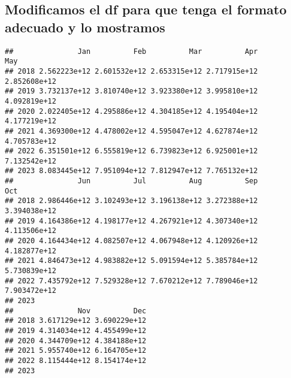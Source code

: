 \documentclass[
]{book}
\newenvironment{Shaded}{\begin{snugshade}}{\end{snugshade}}
\newcommand{\AttributeTok}[1]{\textcolor[rgb]{0.77,0.63,0.00}{#1}}
\newcommand{\CommentTok}[1]{\textcolor[rgb]{0.56,0.35,0.01}{\textit{#1}}}
\newcommand{\DecValTok}[1]{\textcolor[rgb]{0.00,0.00,0.81}{#1}}
\newcommand{\FunctionTok}[1]{\textcolor[rgb]{0.00,0.00,0.00}{#1}}
\newcommand{\NormalTok}[1]{#1}
\newcommand{\OtherTok}[1]{\textcolor[rgb]{0.56,0.35,0.01}{#1}}
\newcommand{\SpecialCharTok}[1]{\textcolor[rgb]{0.00,0.00,0.00}{#1}}
\newcommand{\StringTok}[1]{\textcolor[rgb]{0.31,0.60,0.02}{#1}}
\begin{document}
\hypertarget{modificamos-el-df-para-que-tenga-el-formato-adecuado-y-lo-mostramos}{%
\subsection{Modificamos el df para que tenga el formato adecuado y lo mostramos}\label{modificamos-el-df-para-que-tenga-el-formato-adecuado-y-lo-mostramos}}

\begin{Shaded}
\end{Shaded}

\begin{verbatim}
##               Jan          Feb          Mar          Apr          May
## 2018 2.562223e+12 2.601532e+12 2.653315e+12 2.717915e+12 2.852608e+12
## 2019 3.732137e+12 3.810740e+12 3.923380e+12 3.995810e+12 4.092819e+12
## 2020 2.022405e+12 4.295886e+12 4.304185e+12 4.195404e+12 4.177219e+12
## 2021 4.369300e+12 4.478002e+12 4.595047e+12 4.627874e+12 4.705783e+12
## 2022 6.351501e+12 6.555819e+12 6.739823e+12 6.925001e+12 7.132542e+12
## 2023 8.083445e+12 7.951094e+12 7.812947e+12 7.765132e+12             
##               Jun          Jul          Aug          Sep          Oct
## 2018 2.986446e+12 3.102493e+12 3.196138e+12 3.272388e+12 3.394038e+12
## 2019 4.164386e+12 4.198177e+12 4.267921e+12 4.307340e+12 4.113506e+12
## 2020 4.164434e+12 4.082507e+12 4.067948e+12 4.120926e+12 4.182877e+12
## 2021 4.846473e+12 4.983882e+12 5.091594e+12 5.385784e+12 5.730839e+12
## 2022 7.435792e+12 7.529328e+12 7.670212e+12 7.789046e+12 7.903472e+12
## 2023                                                                 
##               Nov          Dec
## 2018 3.617129e+12 3.690229e+12
## 2019 4.314034e+12 4.455499e+12
## 2020 4.344709e+12 4.384188e+12
## 2021 5.955740e+12 6.164705e+12
## 2022 8.115444e+12 8.154174e+12
## 2023
\end{verbatim}
\end{document}
